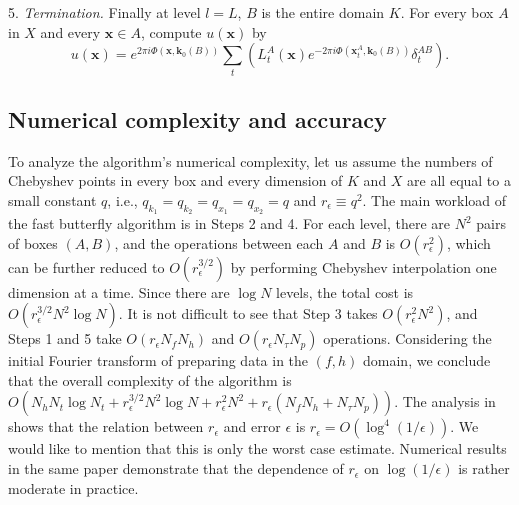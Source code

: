 5.  {\it Termination.} Finally at level $l=L$, $B$ is the entire domain $K$. For every box $A$ in $X$ and every $\mathbf{x}\in A$, compute $u(\mathbf{x})$ by
\begin{equation} \label{Delta5}
u(\mathbf{x})=e^{2\pi i
  \Phi(\mathbf{x},\mathbf{k}_0(B))}\sum_t \left( L_t^A(\mathbf{x}) e^{-2\pi i
  \Phi(\mathbf{x}_t^A,\mathbf{k}_0(B))}
  \delta_t^{AB}\right).
\end{equation}





\subsection{Numerical complexity and accuracy}

To analyze the algorithm's numerical complexity, let us assume the numbers of Chebyshev points in every box and every dimension of $K$ and $X$ are all equal to a small constant $q$, i.e., $q_{k_1}=q_{k_2}=q_{x_1}=q_{x_2}=q$ and $r_{\epsilon}\equiv q^2$. The main workload of the fast butterfly algorithm is in Steps 2 and 4. For each level, there are $N^2$ pairs of boxes $(A,B)$, and the operations between each $A$ and $B$ is $O(r_{\epsilon}^2)$, which can be further reduced to $O(r_{\epsilon}^{3/2})$ by performing Chebyshev interpolation one dimension at a time. Since there are $\log N$ levels, the total cost is $O(r_{\epsilon}^{3/2} N^2\log N)$. It is not difficult to see that Step 3 takes $O(r_{\epsilon}^2 N^2)$, and Steps 1 and 5 take $O(r_{\epsilon}N_fN_h)$ and $O(r_{\epsilon}N_{\tau}N_p)$ operations. Considering the initial Fourier transform of preparing data in the $(f,h)$ domain, we conclude that the overall complexity of the algorithm is $O(N_h N_t \log N_t+ r_{\epsilon}^{3/2}N^2\log N +r_{\epsilon}^2 N^2+ r_{\epsilon}(N_fN_h+N_{\tau}N_p))$. The analysis in \cite{CDY09} shows that the relation between $r_{\epsilon}$ and error $\epsilon$ is $r_{\epsilon}=O(\log ^4(1/\epsilon))$. We would like to mention that this is only the worst case estimate. Numerical results in the same paper demonstrate that the dependence of $r_{\epsilon}$ on $\log(1/\epsilon)$ is rather moderate in practice.

